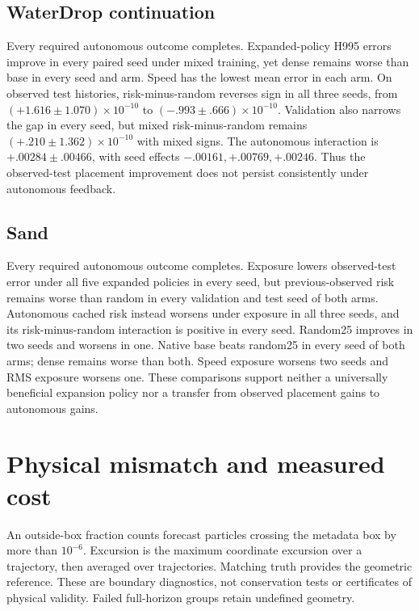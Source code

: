 \subsection{WaterDrop continuation}
\label{sec:waterdrop-110k-exposure}
Every required autonomous outcome completes. Expanded-policy H995 errors improve in every paired seed under mixed training, yet dense remains worse than base in every seed and arm. Speed has the lowest mean error in each arm. On observed test histories, risk-minus-random reverses sign in all three seeds, from $(+1.616\pm1.070)\times10^{-10}$ to $(-.993\pm.666)\times10^{-10}$. Validation also narrows the gap in every seed, but mixed risk-minus-random remains $(+.210\pm1.362)\times10^{-10}$ with mixed signs. The autonomous interaction is $+.00284\pm.00466$, with seed effects $-.00161,+.00769,+.00246$. Thus the observed-test placement improvement does not persist consistently under autonomous feedback.

\subsection{Sand}
\label{sec:sand-graph-exposure}
Every required autonomous outcome completes. Exposure lowers observed-test error under all five expanded policies in every seed, but previous-observed risk remains worse than random in every validation and test seed of both arms. Autonomous cached risk instead worsens under exposure in all three seeds, and its risk-minus-random interaction is positive in every seed. Random25 improves in two seeds and worsens in one. Native base beats random25 in every seed of both arms; dense remains worse than both. Speed exposure worsens two seeds and RMS exposure worsens one. These comparisons support neither a universally beneficial expansion policy nor a transfer from observed placement gains to autonomous gains.

\section{Physical mismatch and measured cost}
\label{sec:physical-cost}
An outside-box fraction counts forecast particles crossing the metadata box by more than $10^{-6}$. Excursion is the maximum coordinate excursion over a trajectory, then averaged over trajectories. Matching truth provides the geometric reference. These are boundary diagnostics, not conservation tests or certificates of physical validity. Failed full-horizon groups retain undefined geometry.


